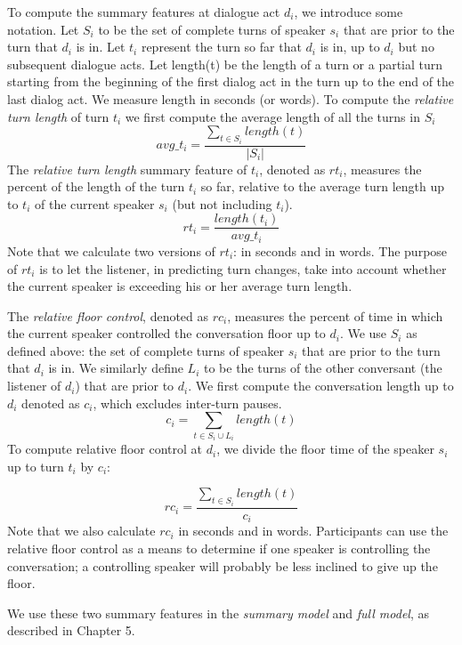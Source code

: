      To compute the summary features at dialogue act $d_i$, we introduce some notation. Let $S_i$ to be the set of complete turns of speaker $s_i$ that are prior to the turn that $d_i$ is in.  Let $t_i$ represent the turn so far that $d_i$ is in, up to $d_i$ but no subsequent dialogue acts.  Let length(t) be the length of a turn or a partial turn starting from the beginning of the first dialog act in the turn up to the end of the last dialog act. We measure length in seconds (or words). To compute the \textit{relative turn length} of turn $t_i$ we first compute the average length of all the turns in $S_i$
%
    \begin{equation}
     avg\_t_i = \frac{\sum_{t \in S_i} length(t)}{|S_i|}
     \end{equation}
     The \textit{relative turn length} summary feature of $t_i$, denoted as $rt_i$, measures the percent of the length of the turn $t_i$ so far, relative to the average turn length up to $t_i$ of the current speaker $s_i$ (but not including $t_i$).
%
     \begin{equation}
            rt_i =  \frac{length(t_i)} {avg\_t_i}
     \end{equation}
     Note that we calculate two versions of $rt_i$: in seconds and in words.  The purpose of $rt_i$ is to let the listener, in predicting turn changes, take into account whether the current speaker is exceeding his or her average turn length.

     The \textit{relative floor control}, denoted as $rc_i$, measures the percent of time in which the current speaker controlled the conversation floor up to $d_i$. We use $S_i$ as defined above:
     the set of complete turns of speaker $s_i$ that are prior to the turn that $d_i$ is in.
     We similarly define $L_i$ to be the turns of the other conversant (the listener of $d_i$) that are prior to $d_i$.
     We first compute the conversation length up to $d_i$ denoted as $c_i$, which excludes inter-turn pauses.
     \begin{equation}
         c_i = \sum_{t \in S_i \cup L_i} length(t)
     \end{equation}
     To compute relative floor control at $d_i$, we divide the floor time of the speaker $s_i$ up to turn $t_i$ by $c_i$:

     \begin{equation}
        rc_i = \frac{\sum_{t \in S_i} length(t)} {c_i}
     \end{equation}
     Note that we also calculate $rc_i$ in seconds and in words. Participants can use the relative floor control as a means to determine if one speaker is controlling the conversation; a controlling speaker will probably be less inclined to give up the floor.

     We use these two summary features in the \textit{summary model} and \textit{full model}, as described in Chapter 5.


